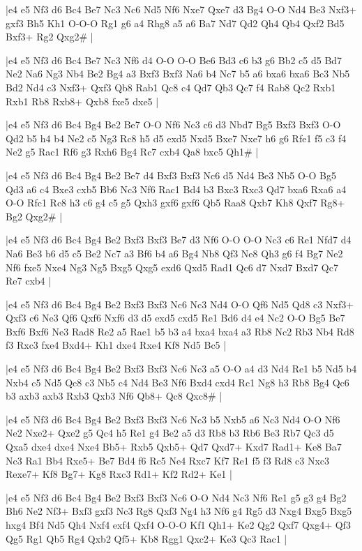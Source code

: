 \whitename{}
\blackname{}
\makegametitle
|e4 e5 Nf3 d6 Bc4 Be7 Nc3 Nc6 Nd5 Nf6 Nxe7 Qxe7 d3 Bg4 O-O Nd4 Be3 Nxf3+ gxf3 Bh5 Kh1 O-O-O Rg1 g6 a4 Rhg8 a5 a6 Ba7 Nd7 Qd2 Qh4 Qb4 Qxf2 Bd5 Bxf3+ Rg2 Qxg2\#  |

\whitename{}
\blackname{}
\makegametitle
|e4 e5 Nf3 d6 Bc4 Be7 Nc3 Nf6 d4 O-O O-O Be6 Bd3 c6 b3 g6 Bb2 c5 d5 Bd7 Ne2 Na6 Ng3 Nb4 Be2 Bg4 a3 Bxf3 Bxf3 Na6 b4 Nc7 b5 a6 bxa6 bxa6 Bc3 Nb5 Bd2 Nd4 c3 Nxf3+ Qxf3 Qb8 Rab1 Qc8 c4 Qd7 Qb3 Qc7 f4 Rab8 Qc2 Rxb1 Rxb1 Rb8 Rxb8+ Qxb8 fxe5 dxe5  |

\whitename{}
\blackname{}
\makegametitle
|e4 e5 Nf3 d6 Bc4 Bg4 Be2 Be7 O-O Nf6 Nc3 c6 d3 Nbd7 Bg5 Bxf3 Bxf3 O-O Qd2 b5 h4 b4 Ne2 c5 Ng3 Rc8 h5 d5 exd5 Nxd5 Bxe7 Nxe7 h6 g6 Rfe1 f5 c3 f4 Ne2 g5 Rac1 Rf6 g3 Rxh6 Bg4 Rc7 cxb4 Qa8 bxc5 Qh1\#  |

\whitename{}
\blackname{}
\makegametitle
|e4 e5 Nf3 d6 Bc4 Bg4 Be2 Be7 d4 Bxf3 Bxf3 Nc6 d5 Nd4 Be3 Nb5 O-O Bg5 Qd3 a6 c4 Bxe3 cxb5 Bb6 Nc3 Nf6 Rac1 Bd4 b3 Bxc3 Rxc3 Qd7 bxa6 Rxa6 a4 O-O Rfc1 Rc8 h3 c6 g4 c5 g5 Qxh3 gxf6 gxf6 Qb5 Raa8 Qxb7 Kh8 Qxf7 Rg8+ Bg2 Qxg2\#  |

\whitename{}
\blackname{}
\makegametitle
|e4 e5 Nf3 d6 Bc4 Bg4 Be2 Bxf3 Bxf3 Be7 d3 Nf6 O-O O-O Nc3 c6 Re1 Nfd7 d4 Na6 Be3 b6 d5 c5 Be2 Nc7 a3 Bf6 b4 a6 Bg4 Nb8 Qf3 Ne8 Qh3 g6 f4 Bg7 Ne2 Nf6 fxe5 Nxe4 Ng3 Ng5 Bxg5 Qxg5 exd6 Qxd5 Rad1 Qc6 d7 Nxd7 Bxd7 Qc7 Re7 cxb4  |

\whitename{}
\blackname{}
\makegametitle
|e4 e5 Nf3 d6 Bc4 Bg4 Be2 Bxf3 Bxf3 Nc6 Nc3 Nd4 O-O Qf6 Nd5 Qd8 c3 Nxf3+ Qxf3 c6 Ne3 Qf6 Qxf6 Nxf6 d3 d5 exd5 cxd5 Re1 Bd6 d4 e4 Nc2 O-O Bg5 Be7 Bxf6 Bxf6 Ne3 Rad8 Re2 a5 Rae1 b5 b3 a4 bxa4 bxa4 a3 Rb8 Nc2 Rb3 Nb4 Rd8 f3 Rxc3 fxe4 Bxd4+ Kh1 dxe4 Rxe4 Kf8 Nd5 Bc5  |

\whitename{}
\blackname{}
\makegametitle
|e4 e5 Nf3 d6 Bc4 Bg4 Be2 Bxf3 Bxf3 Nc6 Nc3 a5 O-O a4 d3 Nd4 Re1 b5 Nd5 b4 Nxb4 c5 Nd5 Qc8 c3 Nb5 c4 Nd4 Be3 Nf6 Bxd4 cxd4 Rc1 Ng8 h3 Rb8 Bg4 Qc6 b3 axb3 axb3 Rxb3 Qxb3 Nf6 Qb8+ Qc8 Qxc8\#  |

\whitename{}
\blackname{}
\makegametitle
|e4 e5 Nf3 d6 Bc4 Bg4 Be2 Bxf3 Bxf3 Nc6 Nc3 b5 Nxb5 a6 Nc3 Nd4 O-O Nf6 Ne2 Nxe2+ Qxe2 g5 Qc4 h5 Re1 g4 Be2 a5 d3 Rb8 b3 Rb6 Be3 Rb7 Qc3 d5 Qxa5 dxe4 dxe4 Nxe4 Bb5+ Rxb5 Qxb5+ Qd7 Qxd7+ Kxd7 Rad1+ Ke8 Ba7 Nc3 Ra1 Bb4 Rxe5+ Be7 Bd4 f6 Rc5 Ne4 Rxc7 Kf7 Re1 f5 f3 Rd8 c3 Nxc3 Rexe7+ Kf8 Bg7+ Kg8 Rxc3 Rd1+ Kf2 Rd2+ Ke1  |

\whitename{}
\blackname{}
\makegametitle
|e4 e5 Nf3 d6 Bc4 Bg4 Be2 Bxf3 Bxf3 Nc6 O-O Nd4 Nc3 Nf6 Re1 g5 g3 g4 Bg2 Bh6 Ne2 Nf3+ Bxf3 gxf3 Nc3 Rg8 Qxf3 Ng4 h3 Nf6 g4 Rg5 d3 Nxg4 Bxg5 Bxg5 hxg4 Bf4 Nd5 Qh4 Nxf4 exf4 Qxf4 O-O-O Kf1 Qh1+ Ke2 Qg2 Qxf7 Qxg4+ Qf3 Qg5 Rg1 Qb5 Rg4 Qxb2 Qf5+ Kb8 Rgg1 Qxc2+ Ke3 Qc3 Rac1  |

